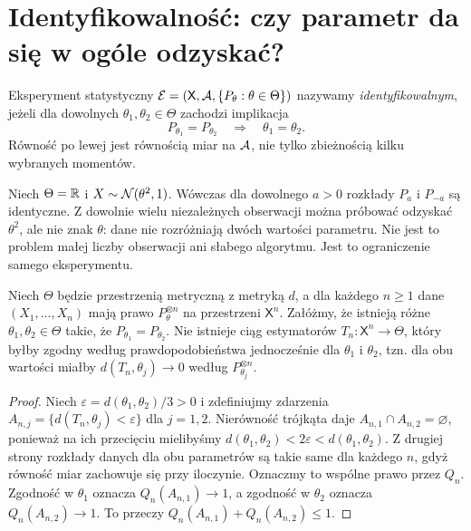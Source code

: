 \section{Identyfikowalność: czy parametr da się w ogóle odzyskać?}
\begin{definicja}[Identyfikowalność]\label{def:ident}
Eksperyment statystyczny $\mathcal E=(\mathsf X,\mathcal A,\{P_\theta:\theta\in\Theta\})$ nazywamy \emph{identyfikowalnym}, jeżeli dla dowolnych $\theta_1,\theta_2\in\Theta$ zachodzi implikacja
\[
P_{\theta_1}=P_{\theta_2}\quad\Longrightarrow\quad \theta_1=\theta_2.
\]
Równość po lewej jest równością miar na $\mathcal A$, nie tylko zbieżnością kilku wybranych momentów.
\end{definicja}

\begin{przyklad}\label{ex:not-identifiable}
Niech $\Theta=\mathbb R$ i $X\sim\mathcal N(\theta^2,1)$. Wówczas dla dowolnego $a>0$ rozkłady $P_a$ i $P_{-a}$ są identyczne. Z dowolnie wielu niezależnych obserwacji można próbować odzyskać $\theta^2$, ale nie znak $\theta$: dane nie rozróżniają dwóch wartości parametru. Nie jest to problem małej liczby obserwacji ani słabego algorytmu. Jest to ograniczenie samego eksperymentu.
\end{przyklad}

\begin{twierdzenie}\label{thm:no-consistency}
Niech $\Theta$ będzie przestrzenią metryczną z metryką $d$, a dla każdego $n\ge1$ dane $(X_1,\ldots,X_n)$ mają prawo $P_\theta^{\otimes n}$ na przestrzeni $\mathsf X^n$. Załóżmy, że istnieją różne $\theta_1,\theta_2\in\Theta$ takie, że $P_{\theta_1}=P_{\theta_2}$. Nie istnieje ciąg estymatorów $T_n:\mathsf X^n\to\Theta$, który byłby zgodny według prawdopodobieństwa jednocześnie dla $\theta_1$ i $\theta_2$, tzn. dla obu wartości miałby $d(T_n,\theta_j)\to0$ według $P_{\theta_j}^{\otimes n}$.
\end{twierdzenie}
\begin{proof}
Niech $\varepsilon=d(\theta_1,\theta_2)/3>0$ i zdefiniujmy zdarzenia $A_{n,j}=\{d(T_n,\theta_j)<\varepsilon\}$ dla $j=1,2$. Nierówność trójkąta daje $A_{n,1}\cap A_{n,2}=\varnothing$, ponieważ na ich przecięciu mielibyśmy $d(\theta_1,\theta_2)<2\varepsilon<d(\theta_1,\theta_2)$. Z drugiej strony rozkłady danych dla obu parametrów są takie same dla każdego $n$, gdyż równość miar zachowuje się przy iloczynie. Oznaczmy to wspólne prawo przez $Q_n$. Zgodność w $\theta_1$ oznacza $Q_n(A_{n,1})\to1$, a zgodność w $\theta_2$ oznacza $Q_n(A_{n,2})\to1$. To przeczy $Q_n(A_{n,1})+Q_n(A_{n,2})\le1$.
\end{proof}

